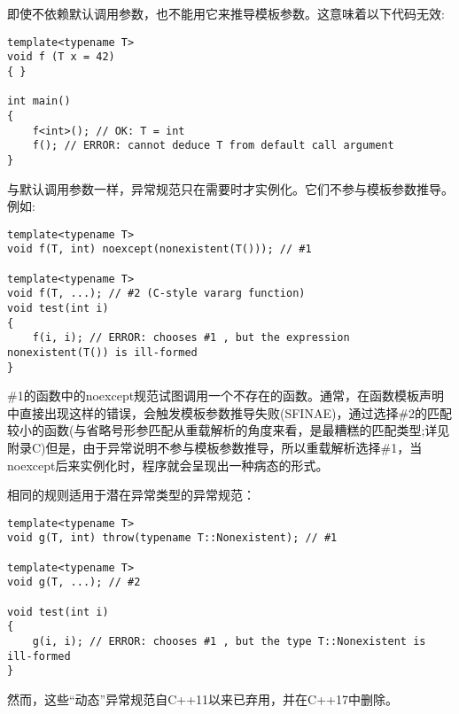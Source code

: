 即使不依赖默认调用参数，也不能用它来推导模板参数。这意味着以下代码无效:

\begin{lstlisting}[style=styleCXX]
template<typename T>
void f (T x = 42)
{ }

int main()
{
	f<int>(); // OK: T = int
	f(); // ERROR: cannot deduce T from default call argument
}
\end{lstlisting}


与默认调用参数一样，异常规范只在需要时才实例化。它们不参与模板参数推导。例如:

\begin{lstlisting}[style=styleCXX]
template<typename T>
void f(T, int) noexcept(nonexistent(T())); // #1

template<typename T>
void f(T, ...); // #2 (C-style vararg function)
void test(int i)
{
	f(i, i); // ERROR: chooses #1 , but the expression nonexistent(T()) is ill-formed
}
\end{lstlisting}

\#1的函数中的noexcept规范试图调用一个不存在的函数。通常，在函数模板声明中直接出现这样的错误，会触发模板参数推导失败(SFINAE)，通过选择\#2的匹配较小的函数(与省略号形参匹配从重载解析的角度来看，是最糟糕的匹配类型;详见附录C)但是，由于异常说明不参与模板参数推导，所以重载解析选择\#1，当noexcept后来实例化时，程序就会呈现出一种病态的形式。

相同的规则适用于潜在异常类型的异常规范：

\begin{lstlisting}[style=styleCXX]
template<typename T>
void g(T, int) throw(typename T::Nonexistent); // #1

template<typename T>
void g(T, ...); // #2

void test(int i)
{
	g(i, i); // ERROR: chooses #1 , but the type T::Nonexistent is ill-formed
}
\end{lstlisting}

然而，这些“动态”异常规范自C++11以来已弃用，并在C++17中删除。


















